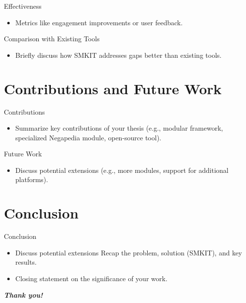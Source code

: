 \documentclass{beamer}
\begin{document}
    \begin{frame}{Effectiveness}
        \begin{itemize}
            \item Metrics like engagement improvements or user feedback.
        \end{itemize}
    \end{frame}

    \begin{frame}{Comparison with Existing Tools}
        \begin{itemize}
            \item Briefly discuss how SMKIT addresses gaps better than existing tools.
        \end{itemize}
    \end{frame}


\section{Contributions and Future Work}
    \begin{frame}{Contributions}
        \begin{itemize}
            \item Summarize key contributions of your thesis (e.g., modular framework, specialized Negapedia module, open-source tool).
        \end{itemize}
    \end{frame}

    \begin{frame}{Future Work}
        \begin{itemize}
            \item Discuss potential extensions (e.g., more modules, support for additional platforms).
        \end{itemize}
    \end{frame}


\section{Conclusion}
    \begin{frame}{Conclusion}
        \begin{itemize}
            \item Discuss potential extensions Recap the problem, solution (SMKIT), and key results.
            \item Closing statement on the significance of your work.
        \end{itemize}
    \end{frame}


\begin{emptyframe}
     \textbf{ \textit{Thank you!} }
\end{emptyframe}

\appendix
    
\end{document}
